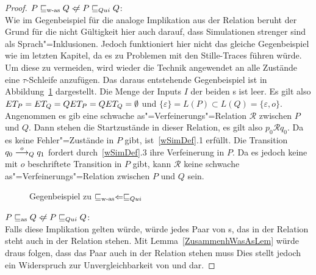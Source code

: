 \begin{proof}
  $P \wasRel Q \hspace{0.1cm}\not\hspace{-0.1cm}\Leftarrow P \QRel Q$:\\
  Wie im Gegenbeispiel für die analoge Implikation aus der Relation \ERel{}
  beruht der Grund für die nicht Gültigkeit hier auch darauf, dass Simulationen
  strenger sind als Sprach"=Inklusionen. Jedoch funktioniert hier nicht das
  gleiche Gegenbeispiel wie im letzten Kapitel, da es zu Problemen mit den
  Stille-Traces führen würde. Um diese zu vermeiden, wird wieder die Technik
  angewendet an alle Zustände eine $\tau$-Schleife anzufügen. Das daraus
  entstehende Gegenbeispiel ist in Abbildung~\ref{WasQuiGegenBsp} dargestellt.
  Die Menge der Inputs $I$ der beiden \MEIO{}s ist leer. Es gilt also $ET _P =
  ET _Q = QET _P = QET _Q = \emptyset$ und $\{\varepsilon\} = L(P) \subset
  L(Q) = \{\varepsilon , o\}$.\\
  Angenommen es gib eine schwache as"=Verfeinerungs"=Relation $\mathcal{R}$
  zwischen $P$ und $Q$. Dann stehen die Startzustände in dieser Relation, es
  gilt also $p_0 \mathcal{R} q_0$. Da es keine Fehler"=Zustände in $P$ gibt,
  ist~\ref{wSimDef}.1 erfüllt. Die Transition $q_0 \must[o]_Q q_1$ fordert
  durch~\ref{wSimDef}.3 ihre Verfeinerung in $P$. Da es jedoch keine mit $o$
  beschriftete Transition in $P$ gibt, kann $\mathcal{R}$ keine schwache
  as"=Verfeinerungs"=Relation zwischen $P$ und $Q$ sein.

  \begin{figure}[htbp]
    \begin{center}
      \caption{Gegenbeispiel zu $\sqsubseteq _{\mathrm{w}\text{-}\mathrm{as}} \Leftarrow  \sqsubseteq  _{Qui}$}
      \label{WasQuiGegenBsp}
    \end{center}
  \end{figure}

  $P \asRel Q \hspace{0.1cm}\not\hspace{-0.1cm}\Leftarrow P \QRel Q$:\\
  Falls diese Implikation gelten würde, würde jedes Paar von \MEIO{}s, das in
  der Relation \QRel{} steht auch in der Relation \asRel{} stehen. Mit
  Lemma~\ref{ZusammenhWasAsLem} würde draus folgen, dass das \MEIO{} Paar auch
  in der Relation \wasRel{} stehen muss Dies stellt jedoch ein Widerspruch zur
  Unvergleichbarkeit von \QRel{} und \wasRel{} dar.


\end{proof}
